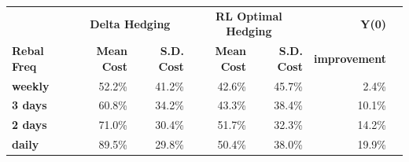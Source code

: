 \documentclass{article}
\begin{document}
\begin{table}[htbp]
\centering
\vspace{0.4em}
\begin{tabular}{lrrrrrr}
\hline
 & \multicolumn{2}{c}{\textbf{Delta Hedging}} & \multicolumn{2}{c}{\textbf{RL Optimal Hedging}} & \textbf{Y(0)} \\
\textbf{Rebal Freq} & \textbf{Mean Cost} & \textbf{S.D. Cost} & \textbf{Mean Cost} & \textbf{S.D. Cost} & \textbf{improvement} \\
\hline
\textbf{weekly} & 52.2\% & 41.2\% & 42.6\% & 45.7\% & 2.4\% \\
\textbf{3 days} & 60.8\% & 34.2\% & 43.3\% & 38.4\% & 10.1\% \\
\textbf{2 days} & 71.0\% & 30.4\% & 51.7\% & 32.3\% & 14.2\% \\
\textbf{daily} & 89.5\% & 29.8\% & 50.4\% & 38.0\% & 19.9\% \\
\hline
\end{tabular}
\end{table}
\end{document}
